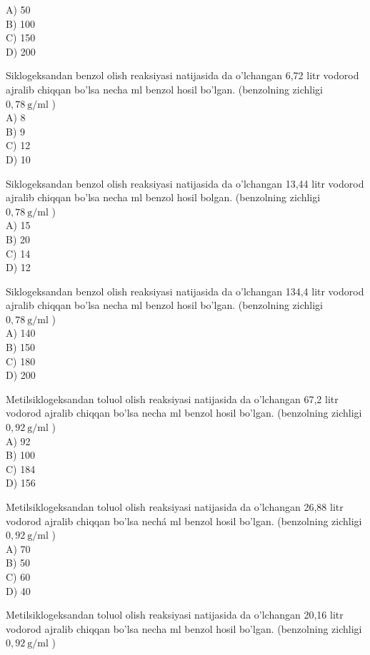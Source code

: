 A) 50\\
B) 100\\
C) 150\\
D) 200
  \item Siklogeksandan benzol olish reaksiyasi natijasida da o'lchangan 6,72 litr vodorod ajralib chiqqan bo'lsa necha ml benzol hosil bo'lgan. (benzolning zichligi $0,78 \mathrm{~g} / \mathrm{ml}$ )\\
A) 8\\
B) 9\\
C) 12\\
D) 10
  \item Siklogeksandan benzol olish reaksiyasi natijasida da o'lchangan 13,44 litr vodorod ajralib chiqqan bo'lsa necha ml benzol hosil bolgan. (benzolning zichligi $0,78 \mathrm{~g} / \mathrm{ml}$ )\\
A) 15\\
B) 20\\
C) 14\\
D) 12
  \item Siklogeksandan benzol olish reaksiyasi natijasida da o'lchangan 134,4 litr vodorod ajralib chiqqan bo'lsa necha ml benzol hosil bo'lgan. (benzolning zichligi $0,78 \mathrm{~g} / \mathrm{ml}$ )\\
A) 140\\
B) 150\\
C) 180\\
D) 200
  \item Metilsiklogeksandan toluol olish reaksiyasi natijasida da o'lchangan 67,2 litr vodorod ajralib chiqqan bo'lsa necha ml benzol hosil bo'lgan. (benzolning zichligi $0,92 \mathrm{~g} / \mathrm{ml}$ )\\
A) 92\\
B) 100\\
C) 184\\
D) 156
  \item Metilsiklogeksandan toluol olish reaksiyasi natijasida da o'lchangan 26,88 litr vodorod ajralib chiqqan bo'lsa nechá ml benzol hosil bo'lgan. (benzolning zichligi $0,92 \mathrm{~g} / \mathrm{ml}$ )\\
A) 70\\
B) 50\\
C) 60\\
D) 40
  \item Metilsiklogeksandan toluol olish reaksiyasi natijasida da o'lchangan 20,16 litr vodorod ajralib chiqqan bo'lsa necha ml benzol hosil bo'lgan. (benzolning zichligi $0,92 \mathrm{~g} / \mathrm{ml}$ )\\
